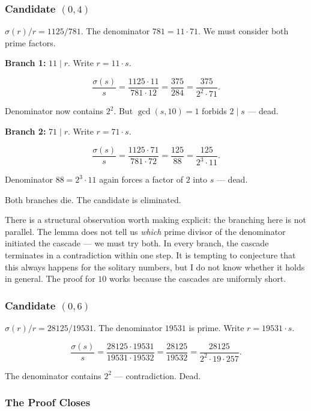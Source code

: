 \documentclass[12pt,a4paper]{article}
\begin{document}
    \subsubsection{Candidate $(0,4)$}

    $\sigma(r)/r = 1125/781$. The denominator $781 = 11 \cdot 71$. We must consider both prime factors.

    \textbf{Branch 1:} $11 \mid r$. Write $r = 11 \cdot s$.

    \[\frac{\sigma(s)}{s} = \frac{1125 \cdot 11}{781 \cdot 12} = \frac{375}{284} = \frac{375}{2^2 \cdot 71}.\]

    Denominator now contains $2^2$. But $\gcd(s,10) = 1$ forbids $2 \mid s$ --- dead.

    \textbf{Branch 2:} $71 \mid r$. Write $r = 71 \cdot s$.

    \[\frac{\sigma(s)}{s} = \frac{1125 \cdot 71}{781 \cdot 72} = \frac{125}{88} = \frac{125}{2^3 \cdot 11}.\]

    Denominator $88 = 2^3 \cdot 11$ again forces a factor of $2$ into $s$ --- dead.

    Both branches die. The candidate is eliminated.

    There is a structural observation worth making explicit: the branching here is not parallel. The lemma does not tell us \emph{which} prime divisor of the denominator initiated the cascade --- we must try both. In every branch, the cascade terminates in a contradiction within one step. It is tempting to conjecture that this always happens for the solitary numbers, but I do not know whether it holds in general. The proof for $10$ works because the cascades are uniformly short.

    \subsubsection{Candidate $(0,6)$}

    $\sigma(r)/r = 28125/19531$. The denominator $19531$ is prime. Write $r = 19531 \cdot s$.

    \[\frac{\sigma(s)}{s} = \frac{28125 \cdot 19531}{19531 \cdot 19532} = \frac{28125}{19532} = \frac{28125}{2^2 \cdot 19 \cdot 257}.\]

    The denominator contains $2^2$ --- contradiction. Dead.

    \subsubsection{The Proof Closes}
\end{document}
